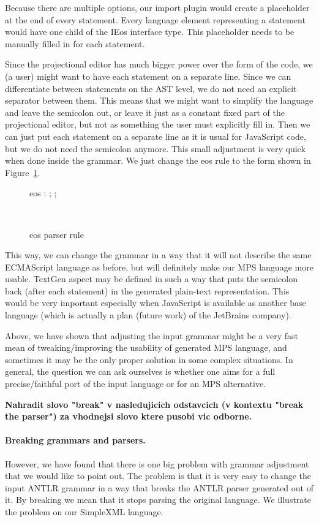 \documentclass[10pt]{sigplanconf}
\newcommand{\todo}[1]{{\bfseries #1}}
\newcommand{\antlrap}{\textquotesingle}
\newcommand{\antlrparserrule}[1]{\textcolor{antlrparserrulecolor}{#1}}
\newcommand{\antlrliteralnoap}[1]{\textcolor{antlrliteralcolor}{#1}}
\newcommand{\antlrliteral}[1]{\antlrap\antlrliteralnoap{#1}\antlrap}
\newcommand{\mpsinterface}[1]{\textcolor{mpsinterfacecolor}{#1}}
\newenvironment{antlr}
{
	\vspace{3mm}
	\par
	\noindent
	\adjustbox{margin=3mm,bgcolor=antlrbgcolor,frame,minipage=394pt,inner=\linewidth}
	\bgroup
	\alltt
}
{
	\endalltt
	\egroup
	\\
	\vspace{2mm}
}
\begin{document}
Because there are multiple options, our import plugin would create a placeholder at the end of every statement.
Every language element representing a statement would have one child of the \mpsinterface{IEos} interface type.
This placeholder needs to be manually filled in for each statement.

Since the projectional editor has much bigger power over the form of the code, we (a user) might want to have each statement on a separate line.
Since we can differentiate between statements on the AST level, we do not need an explicit separator between them.
This means that we might want to simplify the language and leave the semicolon out, or leave it just as a constant fixed part of the projectional editor, but not as something the user must explicitly fill in.
Then we can just put each statement on a separate line as it is usual for JavaScript code, but we do not need the semicolon anymore.
This small adjustment is very quick when done inside the grammar.
We just change the \antlrparserrule{eos} rule to the form shown in Figure~\ref{fig:eosrule}.

\begin{figure}[ht]
\centering
\begin{antlr}
	\antlrparserrule{eos} : \antlrliteral{;} ;
\end{antlr}
\caption{eos parser rule}
\label{fig:eosrule}
\end{figure}

This way, we can change the grammar in a way that it will not describe the same ECMAScript language as before, but will definitely make our MPS language more usable.
TextGen aspect may be defined in such a way that puts the semicolon back (after each statement) in the generated plain-text representation. 
This would be very important especially when JavaScript is available as another base language (which is actually a plan (future work) of the JetBrains company).

Above, we have shown that adjusting the input grammar might be a very fast mean of tweaking/improving the usability of generated MPS language, and sometimes it may be the only proper solution in some complex situations.
In general, the question we can ask ourselves is whether one aims for a full precise/faithful port of the input language or for an MPS alternative.

\todo{Nahradit slovo "break" v nasledujicich odstavcich (v kontextu "break the parser") za vhodnejsi slovo ktere pusobi vic odborne.}

\paragraph{Breaking grammars and parsers.}
However, we have found that there is one big problem with grammar adjustment that we would like to point out.
The problem is that it is very easy to change the input ANTLR grammar in a way that breaks the ANTLR parser generated out of it.
By breaking we mean that it stops parsing the original language.
We illustrate the problem on our SimpleXML language.
\end{document}

